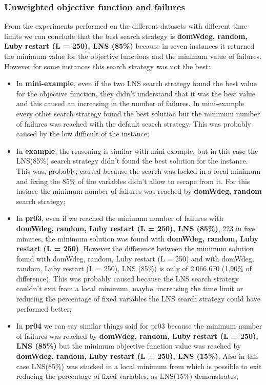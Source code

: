 \subsubsection{Unweighted objective function and failures}
From the experiments performed on the different datasets with different time limits we can conclude that the best search strategy is \textbf{domWdeg, random, Luby restart (L = 250), LNS (85\%)} because in seven instances it returned the minimum value for the objective functions and the minimum value of failures. However for some instances this search strategy was not the best:
\begin{itemize}
    \item In \textbf{mini-example}, even if the two LNS search strategy found the best value for the objective function, they didn't understand that it was the best value and this caused an increasing in the number of failures. In mini-example every other search strategy found the best solution but the minimum number of failures was reached with the default search strategy. This was probably caused by the low difficult of the instance;
    \item In \textbf{example}, the reasoning is similar with mini-example, but in this case the LNS(85\%) search strategy didn't found the best solution for the instance. This was, probably, caused because the search was locked in a local minimum and fixing the 85\% of the variables didn't allow to escape from it. For this instace the minimum number of failures was reached by \textbf{domWdeg, random} search strategy;
    \item In \textbf{pr03}, even if we reached the minimum number of failures with \textbf{domWdeg, random, Luby restart (L = 250), LNS (85\%)}, 223 in five minutes, the minimum solution was found with \textbf{domWdeg, random, Luby restart (L = 250)}. However the difference between the minimum solution found with domWdeg, random, Luby restart (L = 250) and with domWdeg, random, Luby restart (L = 250), LNS (85\%) is only of 2.066.670 (1,90\% of difference). This was probably caused because the LNS search strategy couldn't exit from a local minimum, maybe, increasing the time limit or reducing the percentage of fixed variables the LNS search strategy could have performed better;
    \item In \textbf{pr04} we can say similar things said for pr03 because the minimum number of failures was reached by \textbf{domWdeg, random, Luby restart (L = 250), LNS (85\%)} but the minimum objective function value was reached by \textbf{domWdeg, random, Luby restart (L = 250), LNS (15\%)}. Also in this case LNS(85\%) was stucked in a local minimum from which is possible to exit reducing the percentage of fixed variables, as LNS(15\%) demonstrates;

\end{itemize}
